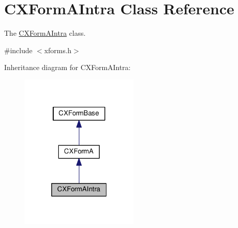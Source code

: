 \hypertarget{classCXFormAIntra}{\section{C\-X\-Form\-A\-Intra Class Reference}
\label{classCXFormAIntra}
}


The \hyperlink{classCXFormAIntra}{C\-X\-Form\-A\-Intra} class.  




{\ttfamily \#include $<$xforms.\-h$>$}



Inheritance diagram for C\-X\-Form\-A\-Intra\-:\nopagebreak
\begin{figure}[H]
\begin{center}
\leavevmode
\includegraphics[width=160pt]{classCXFormAIntra__inherit__graph}
\end{center}
\end{figure}



